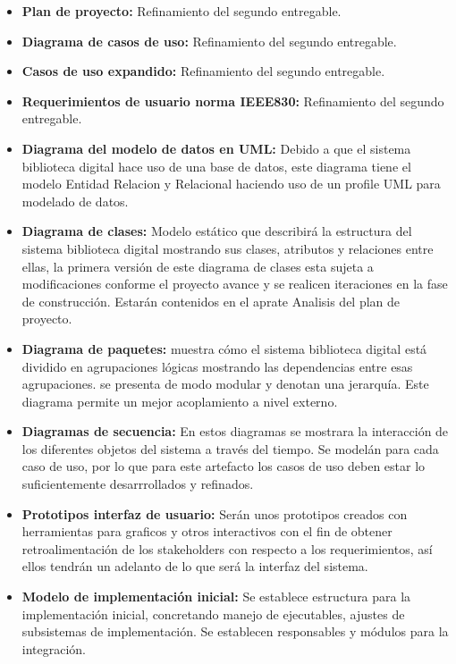 \documentclass[]{article}
\begin{document}
                \begin{itemize}
                \item\textbf{Plan de proyecto:} Refinamiento del segundo entregable.
                \item\textbf{Diagrama de casos de uso:} Refinamiento del segundo entregable.
                \item\textbf{Casos de uso expandido:} Refinamiento del segundo entregable.
                \item\textbf{Requerimientos de usuario norma IEEE830:} Refinamiento del segundo
                entregable.
                \item\textbf{Diagrama del modelo de datos en UML:} Debido a que el sistema
                biblioteca digital hace uso de una base de datos, este diagrama tiene el modelo
                Entidad Relacion y Relacional haciendo uso de un profile UML para modelado de
                datos.
                \item\textbf{Diagrama de clases:} Modelo estático que describirá la estructura del
                sistema biblioteca digital mostrando sus clases, atributos y relaciones entre
                ellas, la primera versión de este diagrama de clases esta sujeta a modificaciones
                conforme el proyecto avance y se realicen iteraciones en la fase de construcción.
                Estarán contenidos en el aprate Analisis del plan de proyecto.
                \item\textbf{Diagrama de paquetes:} muestra cómo el sistema biblioteca digital está
                dividido en agrupaciones lógicas mostrando las dependencias entre esas
                agrupaciones. se presenta de modo modular y denotan una jerarquía. Este diagrama
                permite un mejor acoplamiento a nivel externo.
                \item\textbf{Diagramas de secuencia:} En estos diagramas se mostrara la interacción
                de los diferentes objetos del sistema a través del tiempo. Se modelán para cada
                caso de uso, por lo que para este artefacto los casos de uso deben estar lo
                suficientemente desarrrollados y refinados.
                \item\textbf{Prototipos interfaz de usuario:} Serán unos prototipos creados con
                herramientas para graficos y otros interactivos con el fin de obtener
                retroalimentación de los stakeholders con respecto a los requerimientos, así ellos
                tendrán un adelanto de lo que será la interfaz del sistema.
                \item\textbf{Modelo de implementación inicial:} Se establece estructura para la
                implementación inicial, concretando manejo de ejecutables, ajustes de subsistemas
                de implementación. Se establecen responsables y módulos para la integración.
                \end{itemize}
                
\end{document}
